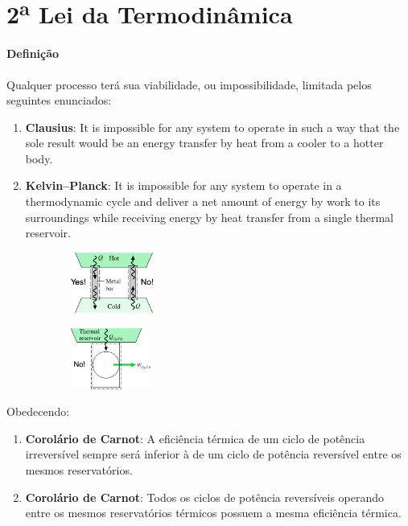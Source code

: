 \documentclass{article}
\begin{document}
    \section{2\textsuperscript{a} Lei da Termodinâmica}
        \paragraph{Definição}Qualquer processo terá sua viabilidade, ou impossibilidade, limitada pelos seguintes enunciados:
            \begin{enumerate}[noitemsep]
                \item \textbf{Clausius}: It is impossible for any system to operate in such a way that the sole result would be an energy transfer by heat from a cooler to a hotter body.
                \item \textbf{Kelvin–Planck}: It is impossible for any system to operate in a thermodynamic cycle and deliver a net amount of energy by work to its surroundings while receiving energy by heat transfer from a single thermal reservoir.
            \end{enumerate}
            \begin{figure}[h]
                \begin{subfigure}[t]{0.5\textwidth}
                    \centering
                    \includegraphics[height = 2cm]{Sistema de Clauss.png}
                \end{subfigure}
                \begin{subfigure}[t]{0.5\textwidth}
                    \centering
                    \includegraphics[height = 2cm]{Sistema Kelvin-Planck.png}
                \end{subfigure}
            \end{figure}
        Obedecendo:
            \begin{enumerate}[noitemsep]
                \item \textbf{Corolário de Carnot}: A eficiência térmica de um ciclo de potência irreversível sempre será inferior à de um ciclo de potência reversível entre os mesmos reservatórios.
                \item \textbf{Corolário de Carnot}: Todos os ciclos de potência reversíveis operando entre os mesmos reservatórios térmicos possuem a mesma eficiência térmica.
            \end{enumerate}
\end{document}

